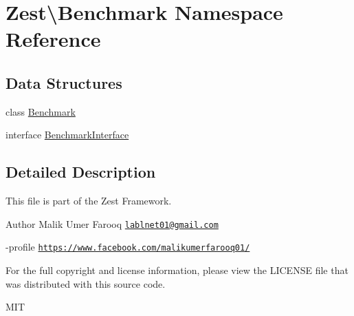 \hypertarget{namespace_zest_1_1_benchmark}{}\section{Zest\textbackslash{}Benchmark Namespace Reference}
\label{namespace_zest_1_1_benchmark}
\subsection*{Data Structures}
\begin{DoxyCompactItemize}
\item 
class \mbox{\hyperlink{class_zest_1_1_benchmark_1_1_benchmark}{Benchmark}}
\item 
interface \mbox{\hyperlink{interface_zest_1_1_benchmark_1_1_benchmark_interface}{Benchmark\+Interface}}
\end{DoxyCompactItemize}


\subsection{Detailed Description}
This file is part of the Zest Framework.

\begin{DoxyAuthor}{Author}
Malik Umer Farooq \href{mailto:lablnet01@gmail.com}{\tt lablnet01@gmail.\+com} 

-\/profile \href{https://www.facebook.com/malikumerfarooq01/}{\tt https\+://www.\+facebook.\+com/malikumerfarooq01/}
\end{DoxyAuthor}
For the full copyright and license information, please view the L\+I\+C\+E\+N\+SE file that was distributed with this source code.

M\+IT 